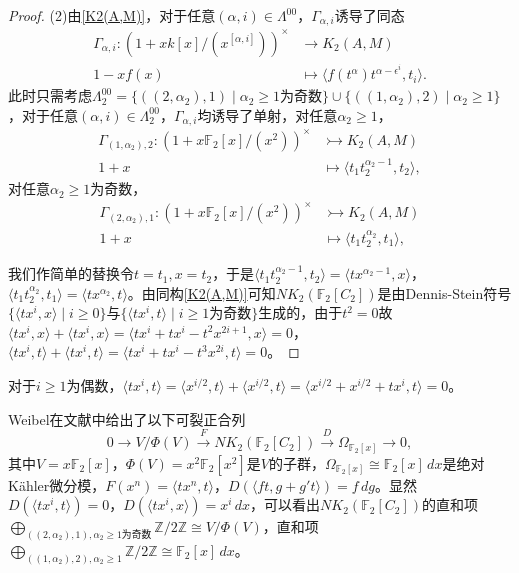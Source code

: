 \begin{proof}
	(2)由\ref{K2(A,M)}，对于任意$(\alpha,i)\in \Lambda^{00}$，$\Gamma_{\alpha,i}$诱导了同态
 \begin{align*}
 \Gamma_{\alpha,i} \colon (1+xk[x]/(x^{[\alpha,i]}))^{\times} &\longrightarrow K_2(A,M)\\
 1-xf(x) &\mapsto \langle f(t^\alpha)t^{\alpha-\epsilon^i},t_i \rangle.
 \end{align*}
 此时只需考虑$\Lambda^{00}_2=\{((2,\alpha_2),1)\mid  \alpha_2\geq 1\text{为奇数}\} \cup \{((1,\alpha_2),2)\mid  \alpha_2\geq 1\}$，对于任意$(\alpha,i)\in \Lambda^{00}_2$，$\Gamma_{\alpha,i}$均诱导了单射，对任意$\alpha_2\geq 1$，
  \begin{align*}
 \Gamma_{(1,\alpha_2),2} \colon (1+x \mathbb{F}_2[x]/(x^{2}))^{\times} &\rightarrowtail K_2(A,M)\\
 1+x &\mapsto 
 \langle t_1t_2^{\alpha_2-1},t_2 \rangle,
 \end{align*}
对任意$\alpha_2\geq 1$为奇数，
 \begin{align*}
 \Gamma_{(2,\alpha_2),1} \colon (1+x \mathbb{F}_2[x]/(x^{2}))^{\times} &\rightarrowtail K_2(A,M)\\
 1+x &\mapsto \langle t_1t_2^{\alpha_2},t_1 \rangle,
 \end{align*}

我们作简单的替换令$t=t_1, x=t_2$，于是$\langle t_1t_2^{\alpha_2-1},t_2 \rangle = \langle tx^{\alpha_2-1},x \rangle$，$\langle t_1t_2^{\alpha_2},t_1 \rangle=\langle t x^{\alpha_2},t  \rangle$。由同构\ref{K2(A,M)}可知$NK_2(\mathbb{F}_2[C_2])$是由Dennis-Stein符号$\{\langle tx^i,x \rangle \mid i\geq 0\}$与$\{\langle tx^i,t \rangle \mid i\geq 1\text{为奇数}\}$生成的，由于$t^2=0$故$\langle tx^i,x \rangle+\langle tx^i,x \rangle=\langle tx^i+tx^i-t^2x^{2i+1},x \rangle=0$，$\langle tx^i,t \rangle+\langle tx^i,t \rangle=\langle tx^i+tx^i-t^3x^{2i},t \rangle=0$。
\end{proof}
\begin{remark}
	对于$i\geq 1\text{为偶数}$，$\langle tx^i,t \rangle=\langle x^{i/2},t \rangle+\langle x^{i/2},t \rangle=\langle x^{i/2}+x^{i/2}+tx^i,t \rangle=0$。
\end{remark}

Weibel在文献\cite{weibel2009nk0}中给出了以下可裂正合列
	\[0\longrightarrow V/\Phi(V) \overset{F}\longrightarrow NK_2(\mathbb{F}_2[C_2])\overset{D}\longrightarrow \Omega_{\mathbb{F}_2[x]}\longrightarrow 0,\]
其中$V=x \mathbb{F}_2[x]$，$\Phi(V)=x^2 \mathbb{F}_2[x^2]$是$V$的子群，$\Omega_{\mathbb{F}_2[x]}\cong \mathbb{F}_2[x]\,d x$是绝对K\"{a}hler微分模，$F(x^n)=\langle tx^n,t \rangle$，$D(\langle ft,g+g't \rangle)=f\,dg$。显然$D(\langle tx^i,t \rangle)=0$，$D(\langle tx^i,x \rangle)=x^i\, dx$，可以看出$NK_2(\mathbb{F}_2[C_2])$的直和项$\bigoplus_{((2,\alpha_2),1), \alpha_2\geq 1\text{为奇数}} \mathbb{Z}/2\mathbb{Z} \cong V/\Phi(V)$，直和项$\bigoplus_{((1,\alpha_2),2), \alpha_2\geq 1} \mathbb{Z}/2\mathbb{Z} \cong \mathbb{F}_2[x]\,d x$。

